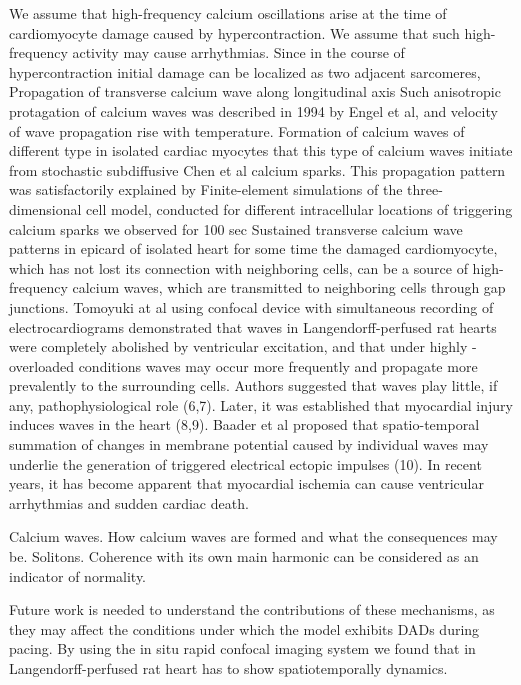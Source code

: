\documentclass{biophys-new}
\begin{document}
We assume that high-frequency calcium oscillations arise at the time of cardiomyocyte damage caused by hypercontraction.
We assume that such high-frequency activity may cause arrhythmias.
Since in the course of hypercontraction initial damage can be localized as two adjacent sarcomeres,
Propagation of transverse calcium wave along longitudinal axis
Such anisotropic protagation of calcium waves was described in 1994 by Engel et al, and velocity of wave propagation rise with temperature.
Formation of calcium waves of different type in isolated cardiac myocytes \cite{ishida1999formation}
that this type of calcium waves initiate from stochastic \cite{izu2001evolution} subdiffusive  \cite{chen2014ryanodine} Chen et al  calcium sparks.
This propagation pattern was satisfactorily explained by Finite-element simulations of the three-dimensional cell model, conducted for different intracellular locations of triggering calcium sparks \cite{tracqui2009integrated}
we observed for 100 sec Sustained transverse calcium wave patterns in epicard of isolated heart
for some time the damaged cardiomyocyte, which has not lost its connection with neighboring cells, can be a source of high-frequency calcium waves, which are transmitted to neighboring cells through gap junctions.
Tomoyuki at al using confocal device with simultaneous recording of electrocardiograms demonstrated that  waves in Langendorff-perfused rat hearts were completely abolished by ventricular excitation, and that under highly  -overloaded conditions  waves may occur more frequently and propagate more prevalently to the surrounding cells. Authors suggested that  waves play little, if any, pathophysiological role (6,7). Later, it was established that myocardial injury induces  waves in the heart (8,9). Baader et al proposed that spatio-temporal summation of changes in membrane potential caused by individual  waves may underlie the generation of triggered electrical ectopic impulses (10).
In recent years, it has become apparent that myocardial ischemia can cause ventricular arrhythmias and sudden cardiac death.


Calcium waves.
How calcium waves are formed and what the consequences may be.
Solitons.
Coherence with its own main harmonic can be considered as an indicator of normality.


Future work is needed to understand the contributions of these mechanisms, as they may affect the conditions under which the model exhibits DADs during pacing.
By using the in situ rapid confocal imaging system
we found that in Langendorff-perfused rat heart has to show
spatiotemporally  dynamics.
\end{document}

